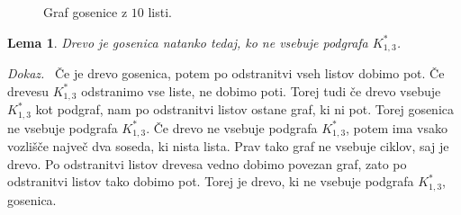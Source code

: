 \documentclass[a4paper, 12pt]{book}
\newtheorem{lema}{Lema}[chapter]
\newenvironment{dokaz}{\emph{Dokaz.}\ }{\hspace{\fill}{$\Box$}}
\begin{document}
\begin{figure}[h]
    \begin{center}        
    \end{center}
    \caption{Graf gosenice z $10$ listi.}
    \label{graf_gosenice_10_listov}
\end{figure}


\begin{lema}
    Drevo je gosenica natanko tedaj, ko ne vsebuje podgrafa $K_{1,3}^*$.
\end{lema}
\begin{dokaz}
    Če je drevo gosenica, potem po odstranitvi vseh listov dobimo pot. Če drevesu $K_{1,3}^*$ odstranimo vse liste, ne dobimo poti. Torej tudi če drevo vsebuje $K_{1,3}^*$ kot podgraf, nam po odstranitvi listov ostane graf, ki ni pot. Torej gosenica ne vsebuje podgrafa $K_{1,3}^*$. Če drevo ne vsebuje podgrafa $K_{1,3}^*$, potem ima vsako vozlišče največ dva soseda, ki nista lista. Prav tako graf ne vsebuje ciklov, saj je drevo. Po odstranitvi listov drevesa vedno dobimo povezan graf, zato po odstranitvi listov tako dobimo pot. Torej je drevo, ki ne vsebuje podgrafa $K_{1,3}^*$, gosenica.
\end{dokaz}
\end{document}
